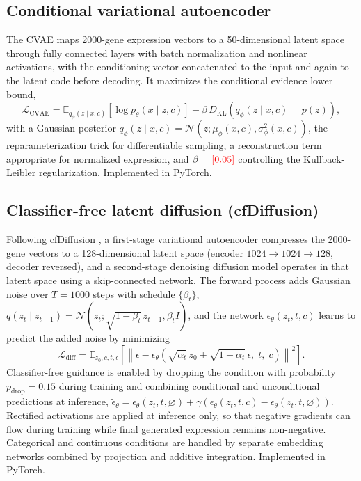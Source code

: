 \documentclass[11pt]{article}
\newcommand{\res}[1]{\textcolor{red}{[#1]}}
\begin{document}
\subsection{Conditional variational autoencoder}
The CVAE maps 2000-gene expression vectors to a 50-dimensional latent space through fully connected layers with batch normalization and nonlinear activations, with the conditioning vector concatenated to the input and again to the latent code before decoding. It maximizes the conditional evidence lower bound,
\begin{equation}
\mathcal{L}_{\mathrm{CVAE}} = \mathbb{E}_{q_\phi(z\mid x,c)}\left[\log p_\theta(x\mid z,c)\right] - \beta\, D_{\mathrm{KL}}\!\left(q_\phi(z\mid x,c)\,\|\,p(z)\right),
\end{equation}
with a Gaussian posterior $q_\phi(z\mid x,c)=\mathcal{N}(z;\mu_\phi(x,c),\sigma_\phi^2(x,c))$, the reparameterization trick for differentiable sampling, a reconstruction term appropriate for normalized expression, and $\beta=\res{0.05}$ controlling the Kullback-Leibler regularization. Implemented in PyTorch.

\subsection{Classifier-free latent diffusion (cfDiffusion)}
Following cfDiffusion \cite{cfdiffusion}, a first-stage variational autoencoder compresses the 2000-gene vectors to a 128-dimensional latent space (encoder $1024\to1024\to128$, decoder reversed), and a second-stage denoising diffusion model operates in that latent space using a skip-connected network. The forward process adds Gaussian noise over $T=1000$ steps with schedule $\{\beta_t\}$, $q(z_t\mid z_{t-1})=\mathcal{N}(z_t;\sqrt{1-\beta_t}\,z_{t-1},\beta_t I)$, and the network $\epsilon_\theta(z_t,t,c)$ learns to predict the added noise by minimizing
\begin{equation}
\mathcal{L}_{\mathrm{diff}} = \mathbb{E}_{z_0,c,t,\epsilon}\left[\left\|\epsilon - \epsilon_\theta\!\left(\sqrt{\bar\alpha_t}\,z_0 + \sqrt{1-\bar\alpha_t}\,\epsilon,\; t,\; c\right)\right\|^2\right].
\end{equation}
Classifier-free guidance is enabled by dropping the condition with probability $p_{\mathrm{drop}}=0.15$ during training and combining conditional and unconditional predictions at inference, $\tilde\epsilon_\theta = \epsilon_\theta(z_t,t,\varnothing) + \gamma\left(\epsilon_\theta(z_t,t,c)-\epsilon_\theta(z_t,t,\varnothing)\right)$. Rectified activations are applied at inference only, so that negative gradients can flow during training while final generated expression remains non-negative. Categorical and continuous conditions are handled by separate embedding networks combined by projection and additive integration. Implemented in PyTorch.
\end{document}
